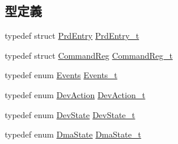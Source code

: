\subsection*{型定義}
\begin{DoxyCompactItemize}
\item 
typedef struct \hyperlink{structPrdEntry}{PrdEntry} \hyperlink{ide__disk_8hh_a9f5eed7ed127258b053477a283b2e469}{PrdEntry\_\-t}
\item 
typedef struct \hyperlink{structCommandReg}{CommandReg} \hyperlink{ide__disk_8hh_af4010b661f64b0062097e418091f5d62}{CommandReg\_\-t}
\item 
typedef enum \hyperlink{ide__disk_8hh_af60e00b78607064c5be6aa9397ea49c1}{Events} \hyperlink{ide__disk_8hh_ab811aa466b9304fc1fc7edf03adb3ebc}{Events\_\-t}
\item 
typedef enum \hyperlink{ide__disk_8hh_a3bae184d288bce92398b814aa118c15c}{DevAction} \hyperlink{ide__disk_8hh_ab9a7252f05d40d629a2b3e780862846c}{DevAction\_\-t}
\item 
typedef enum \hyperlink{ide__disk_8hh_a11f4d653b474b99bf5796f4be62f72c6}{DevState} \hyperlink{ide__disk_8hh_abe49db4804c1744e30c8df026681eaf0}{DevState\_\-t}
\item 
typedef enum \hyperlink{ide__disk_8hh_a8adb9656d6ea50580adaf9c8e7d9eebf}{DmaState} \hyperlink{ide__disk_8hh_a398a1d251e78562f1eccfb43ad5fdf49}{DmaState\_\-t}
\end{DoxyCompactItemize}
